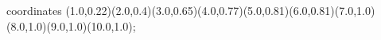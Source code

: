 					coordinates { (1.0,0.22)(2.0,0.4)(3.0,0.65)(4.0,0.77)(5.0,0.81)(6.0,0.81)(7.0,1.0)(8.0,1.0)(9.0,1.0)(10.0,1.0)};